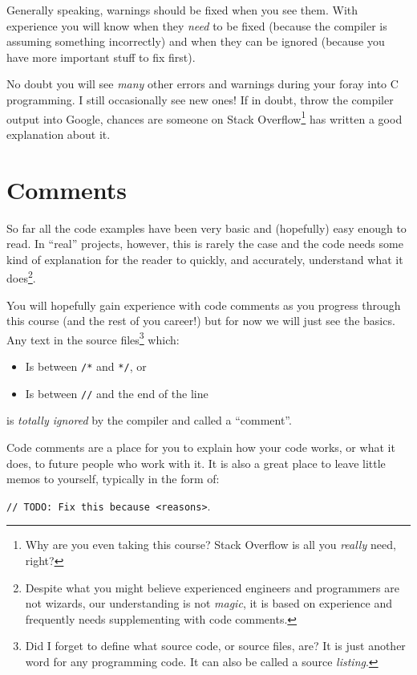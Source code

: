 \documentclass{lab}
\begin{document}
Generally speaking, warnings should be fixed when you see them. With experience you will know when they \textit{need} to be fixed (because the compiler is assuming something incorrectly) and when they can be ignored (because you have more important stuff to fix first).

No doubt you will see \textit{many} other errors and warnings during your foray into C programming. I still occasionally see new ones! If in doubt, throw the compiler output into Google, chances are someone on Stack Overflow\footnote{Why are you even taking this course? Stack Overflow is all you \textit{really} need, right?} has written a good explanation about it.

\pagebreak
\section{Comments}

So far all the code examples have been very basic and (hopefully) easy enough to read. In ``real'' projects, however, this is rarely the case and the code needs some kind of explanation for the reader to quickly, and accurately, understand what it does\footnote{Despite what you might believe experienced engineers and programmers are not wizards, our understanding is not \textit{magic}, it is based on experience and frequently needs supplementing with code comments.}.

You will hopefully gain experience with code comments as you progress through this course (and the rest of you career!) but for now we will just see the basics. Any text in the source files\footnote{Did I forget to define what source code, or source files, are? It is just another word for any programming code. It can also be called a source \textit{listing}.} which:

\begin{itemize}
\item Is between \texttt{/*} and \texttt{*/}, or
\item Is between \texttt{//} and the end of the line
\end{itemize}

is \textit{totally ignored} by the compiler and called a ``comment''.

Code comments are a place for you to explain how your code works, or what it does, to future people who work with it. It is also a great place to leave little memos to yourself, typically in the form of:

\texttt{// TODO: Fix this because <reasons>}.
\end{document}
